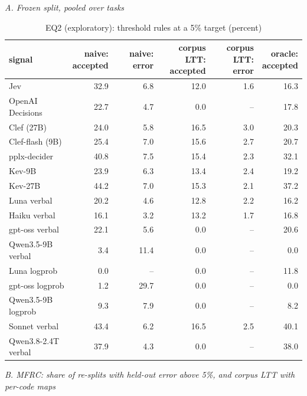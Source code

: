 \begin{table}[t]
\centering
\small
\caption{EQ2 (exploratory): threshold rules at a 5\% target (percent)}
\label{tab:tab07c_threshold_rules}
\par\textit{A. Frozen split, pooled over tasks}\par\smallskip
\begin{adjustbox}{max width=\linewidth}
\begin{tabular}{lrrrrr}
\toprule
signal & \makecell[br]{naive: \\{} accepted} & naive: error & \makecell[br]{corpus LTT: \\{} accepted} & \makecell[br]{corpus LTT: \\{} error} & \makecell[br]{oracle: \\{} accepted} \\
\midrule
Jev & 32.9 & 6.8 & 12.0 & 1.6 & 16.3 \\
OpenAI Decisions & 22.7 & 4.7 & 0.0 & -- & 17.8 \\
Clef (27B) & 24.0 & 5.8 & 16.5 & 3.0 & 20.3 \\
Clef-flash (9B) & 25.4 & 7.0 & 15.6 & 2.7 & 20.7 \\
pplx-decider & 40.8 & 7.5 & 15.4 & 2.3 & 32.1 \\
Kev-9B & 23.9 & 6.3 & 13.4 & 2.4 & 19.2 \\
Kev-27B & 44.2 & 7.0 & 15.3 & 2.1 & 37.2 \\
Luna verbal & 20.2 & 4.6 & 12.8 & 2.2 & 16.2 \\
Haiku verbal & 16.1 & 3.2 & 13.2 & 1.7 & 16.8 \\
gpt-oss verbal & 22.1 & 5.6 & 0.0 & -- & 20.6 \\
Qwen3.5-9B verbal & 3.4 & 11.4 & 0.0 & -- & 0.0 \\
Luna logprob & 0.0 & -- & 0.0 & -- & 11.8 \\
gpt-oss logprob & 1.2 & 29.7 & 0.0 & -- & 0.0 \\
Qwen3.5-9B logprob & 9.3 & 7.9 & 0.0 & -- & 8.2 \\
Sonnet verbal & 43.4 & 6.2 & 16.5 & 2.5 & 40.1 \\
Qwen3.8-2.4T verbal & 37.9 & 4.3 & 0.0 & -- & 38.0 \\
\bottomrule
\end{tabular}
\end{adjustbox}
\medskip
\par\textit{B. MFRC: share of re-splits with held-out error above 5\%, and corpus LTT with per-code maps}\par\smallskip

\end{table}
